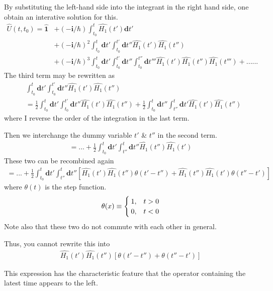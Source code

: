 ﻿\documentclass[twoside]{book}
\numberwithin{equation}{section}
\begin{document}
 By substituting the left-hand side into the integrant in the right hand side, one obtain an interative solution for this.
\begin{align}
\hat{U}(t,t_0)=\hat{\bm{1}} &+(-\bm{i}/\hbar) \int_{t_0}^{t} \hat{H_1}(t')\bm{d}t' \nonumber\\
&+(-\bm{i}/\hbar)^2\int_{t_0}^{t}\bm{d}t'\int_{t_0}^{t'}\bm{d}t''\hat{H_1}(t')\hat{H_1}(t'')\nonumber\\
&+(-\bm{i}/\hbar)^3  \int_{t_0}^{t}\bm{d}t'\int_{t_0}^{t'}\bm{d}t''\int_{t_0}^{t''}\bm{d}t'''\hat{H_1}(t')\hat{H_1}(t'')\hat{H_1}(t''')+...... \nonumber
\end{align}
The third term may be rewritten as
\begin{align}
&\int_{t_0}^{t}\bm{d}t'\int_{t_0}^{t'}\bm{d}t''\hat{H_1}(t')\hat{H_1}(t'')\nonumber\\
&=\frac{1}{2}\int_{t_0}^{t}\bm{d}t'\int_{t_0}^{t'}\bm{d}t''\hat{H_1}(t')\hat{H_1}(t'')+\frac{1}{2}\int_{t_0}^{t}\bm{d}t''\int_{t''}^{t}\bm{d}t'\hat{H_1}(t')\hat{H_1}(t'')\nonumber
\end{align}
where I reverse the order of the integration in the last term.

 Then we interchange the dummy variable $t'$ \& $t''$ in the second term.
\begin{align}
=...+\frac{1}{2}\int_{t_0}^{t}\bm{d}t'\int_{t''}^{t}\bm{d}t''\hat{H_1}(t'')\hat{H_1}(t')\nonumber
\end{align}
 These two can be recombined again
\begin{align}
=...+\frac{1}{2}\int_{t_0}^{t}\bm{d}t'\int_{t''}^{t}\bm{d}t''[\hat{H_1}(t')\hat{H_1}(t'')\theta(t'-t'')+\hat{H_1}(t'')\hat{H_1}(t')\theta(t''-t')]\nonumber
\end{align}
where $\theta(t)$ is the step function.
\begin{eqnarray}
\theta(x)\equiv
\begin{cases}
1, &t>0 \cr 0, &t<0\end{cases} \nonumber
\end{eqnarray}
 Note also that these two do not commute with each other in general.

 Thus, you cannot rewrite this into
\begin{align}
\hat{H_1}(t')\hat{H_1}(t'')[\theta(t'-t'')+\theta(t''-t')] \nonumber
\end{align}

 This expression has the characteristic feature that the operator containing the latest  time appears to the left.
\end{document}
